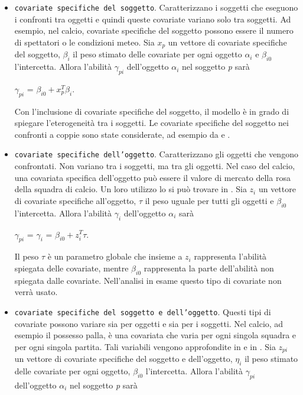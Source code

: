 \begin{itemize}
	\item \texttt{covariate specifiche del soggetto}. Caratterizzano i soggetti che eseguono i confronti tra oggetti e quindi queste covariate variano solo tra soggetti. Ad esempio, nel calcio, covariate specifiche del soggetto possono essere il numero di spettatori o le condizioni meteo. Sia $x_p$ un vettore di covariate specifiche del soggetto, $\beta_i$ il peso stimato delle covariate per ogni oggetto $\alpha_{i}$ e $\beta_{i0}$ l'intercetta. Allora l'abilità $\gamma_{pi}$ dell'oggetto $\alpha_{i}$ nel soggetto \emph{p} sarà
	\begin{center}
		$ \gamma_{pi}$ = $\beta_{i0} + x^{T}_{p}\beta_i$.
	\end{center}
	
	Con l'inclusione di covariate specifiche del soggetto, il modello è in grado di spiegare l'eterogeneità tra i soggetti. Le covariate specifiche del soggetto nei confronti a coppie sono state considerate, ad esempio da \textcite{francis2010} e \textcite{Turner2012Firth}.
	\item \texttt{covariate specifiche dell'oggetto}. Caratterizzano gli oggetti che vengono confrontati. Non variano tra i soggetti, ma tra gli oggetti. Nel caso del calcio, una covariata specifica dell'oggetto può essere il valore di mercato della rosa della squadra di calcio. Un loro utilizzo lo si può trovare in \textcite{schauberger2017}.
	Sia $z_{i}$ un vettore di covariate specifiche all'oggetto, $\tau$ il peso uguale per tutti gli oggetti e $\beta_{i0}$ l'intercetta. Allora l'abilità $\gamma_{i}$ dell'oggetto $\alpha_{i}$ sarà
	\begin{center}
		$\gamma_{pi}$ = $ \gamma_{i}$ = $\beta_{i0} + z^{T}_{i}\tau$.
	\end{center}
	Il peso $\tau$ è un parametro globale che insieme a $z_{i}$ rappresenta l'abilità spiegata delle covariate, mentre $\beta_{i0}$ rappresenta la parte dell'abilità non spiegata dalle covariate. Nell'analisi in esame questo tipo di covariate non verrà usato.
	\item \texttt{covariate specifiche del soggetto e dell'oggetto}. Questi tipi di covariate possono variare sia per oggetti e sia per i soggetti. Nel calcio, ad esempio il possesso palla, è una covariata che varia per ogni singola squadra e per ogni singola partita. Tali variabili vengono approfondite in \textcite{thurner2000policy} e in \textcite{mauerer2015modeling}. Sia $z_{pi}$ un vettore di covariate specifiche del soggetto e dell'oggetto, $\eta_i$ il peso stimato delle covariate per ogni oggetto, $\beta_{i0}$ l'intercetta. Allora l'abilità $\gamma_{pi}$ dell'oggetto $\alpha_{i}$ nel soggetto \emph{p} sarà

\end{itemize}
